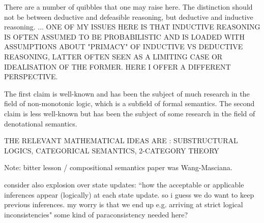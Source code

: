 \documentclass[a4paper,11pt]{report}
\begin{document}
There are a number of quibbles that one may raise here. The distinction should not be between deductive and defeasible reasoning, but deductive and inductive reasoning. ... ONE OF MY ISSUES HERE IS THAT INDUCTIVE REASONING IS OFTEN ASSUMED TO BE PROBABILISTIC AND IS LOADED WITH ASSUMPTIONS ABOUT "PRIMACY" OF INDUCTIVE VS DEDUCTIVE REASONING, LATTER OFTEN SEEN AS A LIMITING CASE OR IDEALISATION OF THE FORMER. HERE I OFFER A DIFFERENT PERSPECTIVE.



The first claim is well-known and has been the subject of much research in the field of non-monotonic logic, which is a subfield of formal semantics. The second claim is less well-known but has been the subject of some research in the field of denotational semantics.

THE RELEVANT MATHEMATICAL IDEAS ARE : SUBSTRUCTURAL LOGICS, CATEGORICAL SEMANTICS, 2-CATEGORY THEORY

Note: bitter lesson / compositional semantics paper was Wang-Masciana.

consider also explosion over state updates: ``how the acceptable or applicable inferences appear (logically) at each state update. so i guess we do want to keep previous inferences. my worry is that we end up e.g. arriving at strict logical inconsistencies" some kind of paraconsistency needed here? 
\end{document}
